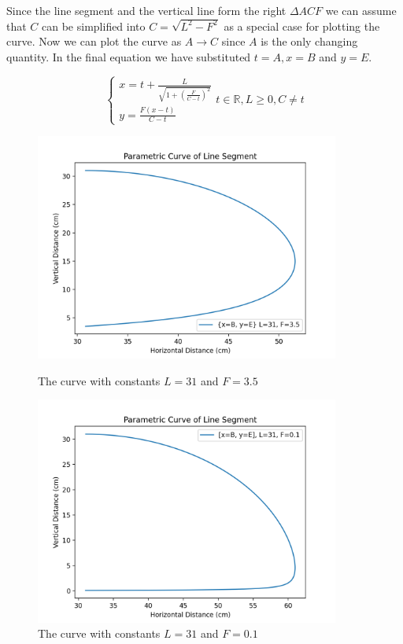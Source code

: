 \documentclass{article}
\begin{document}
Since the line segment and the vertical line form the right $\Delta ACF$ we can assume that $C$ can be simplified into $C=\sqrt{L^2-F^2}$ as a special case for plotting the curve. Now we can plot the curve as $A \to C$ since $A$ is the only changing quantity. In the final equation we have substituted $t=A, x=B$ and $y=E$.

\[\begin{cases}
        x=t+ \frac{L}{\sqrt{1+\left(\frac{F}{C-t}\right)^2}}\\
        y=\frac{F(x-t)}{C-t}
    \end{cases}
    t\in \mathbb{R},L \geq 0, C\neq t\]

\begin{figure}[htp]
    \centering
    \includegraphics[width=10cm]{Parametric-Curve.png}
    \caption{The curve with constants $L=31$ and $F=3.5$}
    
    \vspace{1 cm}
    
    \includegraphics[width=10cm]{Curve-Small-F.png}
    \caption{The curve with constants $L=31$ and $F=0.1$}
\end{figure}
\end{document}
